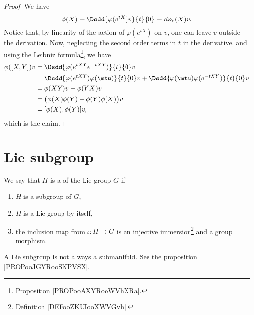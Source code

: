 \begin{proof}
	We have
	\begin{equation}
		\phi(X)=\Dsdd{ \varphi( e^{tX})v }{t}{0}=d\varphi_e(X)v.
	\end{equation}
	Notice that, by linearity of the action of $\varphi( e^{tX})$ on $v$, one can leave $v$ outside the derivation. Now, neglecting the second order terms in $t$ in the derivative, and using the Leibniz formula\footnote{Proposition \ref{PROPooAXYRooWVhXRa}.}, we have
	\begin{equation}
		\begin{aligned}[]
			\phi([X,Y])v & =  \Dsdd{ \varphi( e^{tXY} e^{-tXY}) }{t}{0}v                                                     \\
			             & =  \Dsdd{ \varphi( e^{tXY})\varphi(\mtu) }{t}{0}v+\Dsdd{ \varphi(\mtu)\varphi( e^{-tXY}) }{t}{0}v \\
			             & =  \phi(XY)v-\phi(YX)v                                                                            \\
			             & =  \big( \phi(X)\phi(Y)-\phi(Y)\phi(X) \big)v                                                     \\
			             & =  [\phi(X),\phi(Y)]v,
		\end{aligned}
	\end{equation}
	which is the claim.
\end{proof}

\section{Lie subgroup}

\begin{definition}        \label{DEFooGCHDooHUMSju}
	We say that \( H\) is a  of the Lie group \( G\) if
	\begin{enumerate}
		\item
		      \( H\) is a subgroup of \( G\),
		\item
		      \( H\) is a Lie group by itself,
		\item
		      the inclusion map from \( \iota\colon H\to G\) is an injective immersion\footnote{Definition \ref{DEFooZKUIooXWVGvh}.} and a group morphism.
	\end{enumerate}
\end{definition}

\begin{remark}
	A Lie subgroup is not always a submanifold. See the proposition \ref{PROPooJGYRooSKPVSX}.
\end{remark}

